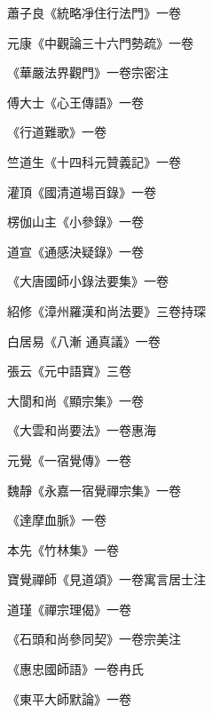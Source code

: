 \begin{pinyinscope}
 蕭子良《統略凈住行法門》一卷



 元康《中觀論三十六門勢疏》一卷



 《華嚴法界觀門》一卷宗密注



 傅大士《心王傳語》一卷



 《行道難歌》一卷



 竺道生《十四科元贊義記》一卷



 灌頂《國清道場百錄》一卷



 楞伽山主《小參錄》一卷



 道宣《通感決疑錄》一卷



 《大唐國師小錄法要集》一卷



 紹修《漳州羅漢和尚法要》三卷持琛



 白居易《八漸
 通真議》一卷



 張云《元中語寶》三卷



 大閬和尚《顯宗集》一卷



 《大雲和尚要法》一卷惠海



 元覺《一宿覺傳》一卷



 魏靜《永嘉一宿覺禪宗集》一卷



 《達摩血脈》一卷



 本先《竹林集》一卷



 寶覺禪師《見道頌》一卷寓言居士注



 道瑾《禪宗理偈》一卷



 《石頭和尚參同契》一卷宗美注



 《惠忠國師語》一卷冉氏



 《東平大師默論》一卷




\end{pinyinscope}
